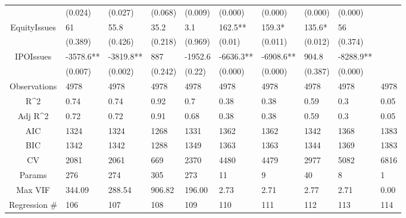 \documentclass{article}
\begin{document}
\begin{table}[H]
\begin{tabular}{|clllllllll|}
   & (0.024) & (0.027) & (0.068) & (0.009) & (0.000) & (0.000) & (0.000) & (0.000) &  \\ 
  EquityIssues & 61 & 55.8 & 35.2 & 3.1 & 162.5** & 159.3* & 135.6* & 56 &  \\ 
   & (0.389) & (0.426) & (0.218) & (0.969) & (0.01) & (0.011) & (0.012) & (0.374) &  \\ 
  IPOIssues & -3578.6** & -3819.8** & 887 & -1952.6 & -6636.3** & -6908.6** & 904.8 & -8288.9** &  \\ 
   & (0.007) & (0.002) & (0.242) & (0.22) & (0.000) & (0.000) & (0.387) & (0.000) &  \\ 
  \hline 
 Observations & 4978 & 4978 & 4978 & 4978 & 4978 & 4978 & 4978 & 4978 & 4978 \\ 
  R^2 & 0.74 & 0.74 & 0.92 & 0.7 & 0.38 & 0.38 & 0.59 & 0.3 & 0.05 \\ 
  Adj R^2 & 0.72 & 0.72 & 0.91 & 0.68 & 0.38 & 0.38 & 0.59 & 0.3 & 0.05 \\ 
  AIC & 1324 & 1324 & 1268 & 1331 & 1362 & 1362 & 1342 & 1368 & 1383 \\ 
  BIC & 1342 & 1342 & 1288 & 1349 & 1363 & 1363 & 1344 & 1369 & 1383 \\ 
  CV & 2081 & 2061 & 669 & 2370 & 4480 & 4479 & 2977 & 5082 & 6816 \\ 
  Params & 276 & 274 & 305 & 273 & 11 & 9 & 40 & 8 & 1 \\ 
  Max VIF & 344.09 & 288.54 & 906.82 & 196.00 & 2.73 & 2.71 & 2.77 & 2.71 & 0.00 \\ 
  Regression \# & 106 & 107 & 108 & 109 & 110 & 111 & 112 & 113 & 114 \\ 
   \hline
\end{tabular}
 
\end{table}
\end{document}

